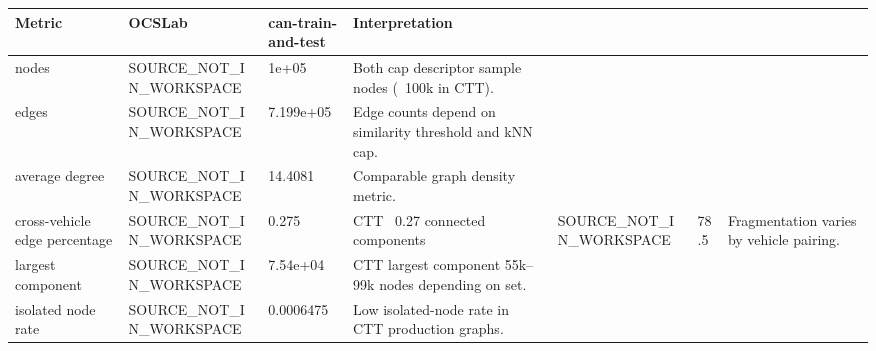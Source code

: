 \begin{tabular}{llll}
\toprule
Metric & OCSLab & can-train-and-test & Interpretation \\
\midrule
nodes & SOURCE_NOT_IN_WORKSPACE & 1e+05 & Both cap descriptor sample nodes (~100k in CTT). \\
edges & SOURCE_NOT_IN_WORKSPACE & 7.199e+05 & Edge counts depend on similarity threshold and kNN cap. \\
average degree & SOURCE_NOT_IN_WORKSPACE & 14.4081 & Comparable graph density metric. \\
cross-vehicle edge percentage & SOURCE_NOT_IN_WORKSPACE & 0.275 & CTT ~0.27%
connected components & SOURCE_NOT_IN_WORKSPACE & 78.5 & Fragmentation varies by vehicle pairing. \\
largest component & SOURCE_NOT_IN_WORKSPACE & 7.54e+04 & CTT largest component 55k–99k nodes depending on set. \\
isolated node rate & SOURCE_NOT_IN_WORKSPACE & 0.0006475 & Low isolated-node rate in CTT production graphs. \\
\bottomrule
\end{tabular}
